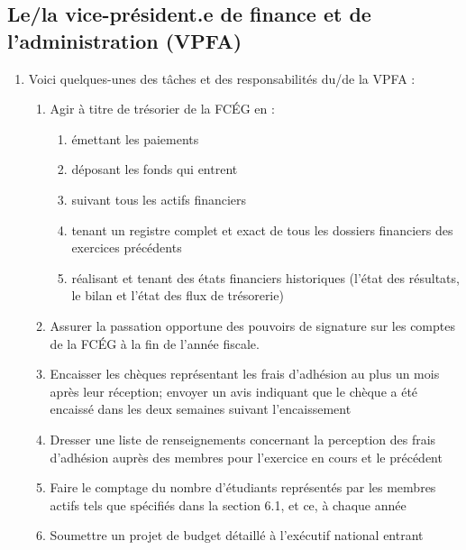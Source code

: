 \subsection{Le/la vice-président.e de finance et de l'administration (VPFA)}
\label{le-la-vice-president-e-de-finance-et-de-l-administration-vpfa}

\begin{enumerate}
 \item
  Voici quelques-unes des tâches et des responsabilités du/de la VPFA :
  \begin{enumerate}
   \item
    Agir à titre de trésorier de la FCÉG en :

    \begin{enumerate}
     \item
      émettant les paiements
     \item
      déposant les fonds qui entrent
     \item
      suivant tous les actifs financiers
     \item
      tenant un registre complet et exact de tous les dossiers financiers des exercices précédents
     \item
      réalisant et tenant des états financiers historiques (l'état des résultats, le bilan et l'état des flux de trésorerie)
    \end{enumerate}
   \item
    Assurer la passation opportune des pouvoirs de signature sur les comptes de la FCÉG à la fin de l'année fiscale.
   \item
    Encaisser les chèques représentant les frais d'adhésion au plus un mois après leur réception; envoyer un avis indiquant que le chèque a été encaissé dans les deux semaines suivant l'encaissement
   \item
    Dresser une liste de renseignements concernant la perception des frais d'adhésion auprès des membres pour l'exercice en cours et le précédent
   \item
    Faire le comptage du nombre d'étudiants représentés par les membres actifs tels que spécifiés dans la section 6.1, et ce, à chaque année
   \item
    Soumettre un projet de budget détaillé à l'exécutif national entrant


\end{enumerate}
\end{enumerate}
